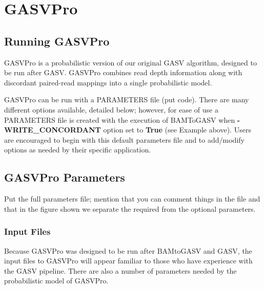 \documentclass[11pt]{article}
\begin{document}
\section{GASVPro}

\subsection{Running GASVPro}
GASVPro is a probabilistic version of our original GASV algorithm, designed to be run after GASV. GASVPro combines read depth information along with discordant paired-read mappings into a single probabilistic model. 

GASVPro can be run with a PARAMETERS file (put code). There are many different options available, detailed below; however, for ease of use a PARAMETERS file is created with the execution of BAMToGASV when {\bf-WRITE\_CONCORDANT} option set to {\bf True} (see Example above). Users are encouraged to begin with this default parameters file and to add/modify options as needed by their specific application.

\subsection{GASVPro Parameters} 

Put the full parameters file; mention that you can comment things in the file and that in the figure shown we separate the required from the optional parameters. 


\subsubsection{Input Files}
Because GASVPro was designed to be run after BAMtoGASV and GASV, the input files to GASVPro will appear familiar to those who have experience with the GASV pipeline. There are also a number of parameters needed by the probabilistic model of GASVPro.
\end{document}
